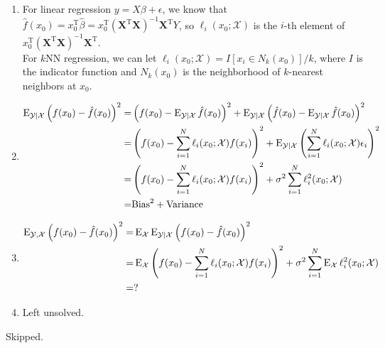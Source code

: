 \begin{sol}
\begin{enumerate}[label={(\alph*)}]
\item 
For linear regression $y=X\beta+\epsilon$, we know that $\hat{f}(x_0)=x_0^\mathrm{T}\hat{\beta}=x_0^\mathrm{T}(\mathbf{X}^\mathrm{T}\mathbf{X})^{-1}\mathbf{X}^\mathrm{T}Y$, so $\ell_i(x_0;\mathcal{X})$ is the $i$-th element of $x_0^\mathrm{T}(\mathbf{X}^\mathrm{T}\mathbf{X})^{-1}\mathbf{X}^\mathrm{T}$.\\
For $k$NN regression, we can let $\ell_i(x_0;\mathcal{X})=I[x_i\in N_k(x_0)]/k$, where $I$ is the indicator function and $N_k(x_0)$ is the neighborhood of $k$-nearest neighbors at $x_0$.

\item
\begin{align*}
\operatorname{E}_{\mathcal{Y}\vert\mathcal{X}}\left(f(x_0)-\hat{f}(x_0)\right)^2 =& \left(f(x_0)-\operatorname{E}_{\mathcal{Y}\vert\mathcal{X}}\hat{f}(x_0)\right)^2+\operatorname{E}_{\mathcal{Y}\vert\mathcal{X}}\left(\hat{f}(x_0)-\operatorname{E}_{\mathcal{Y}\vert\mathcal{X}}\hat{f}(x_0)\right)^2 \\
=& \left(f(x_0)-\sum_{i=1}^N\ell_i(x_0;\mathcal{X})f(x_i)\right)^2 + \operatorname{E}_{\mathcal{Y}\vert\mathcal{X}}\left(\sum_{i=1}^N\ell_i(x_0;\mathcal{X})\epsilon_i\right)^2 \\
=& \left(f(x_0)-\sum_{i=1}^N\ell_i(x_0;\mathcal{X})f(x_i)\right)^2 + \sigma^2\sum_{i=1}^N\ell_i^2(x_0;\mathcal{X})\\
=& \mathrm{Bias}^2+\mathrm{Variance}
\end{align*}

\item
\begin{align*}
\operatorname{E}_{\mathcal{Y},\mathcal{X}}\left(f(x_0)-\hat{f}(x_0)\right)^2 =& \operatorname{E}_{\mathcal{X}}\operatorname{E}_{\mathcal{Y}\vert\mathcal{X}}\left(f(x_0)-\hat{f}(x_0)\right)^2 \\
=& \operatorname{E}_{\mathcal{X}}\left(f(x_0)-\sum_{i=1}^N\ell_i(x_0;\mathcal{X})f(x_i)\right)^2 + \sigma^2 \sum_{i=1}^N\operatorname{E}_{\mathcal{X}}\ell_i^2(x_0;\mathcal{X}) \\
=& ?
\end{align*}
\item Left unsolved.
\end{enumerate}
\end{sol}

\begin{sol}
Skipped.
\end{sol}

